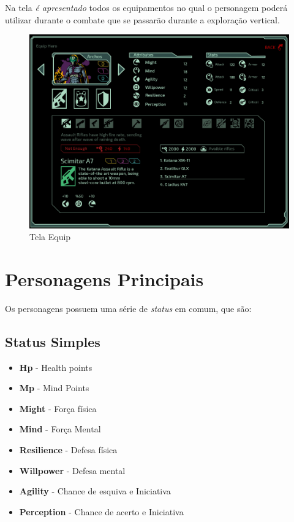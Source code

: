 \documentclass[11pt]{article} %
\begin{document}
Na tela \textit{é apresentado} todos os equipamentos no qual o personagem poderá utilizar durante o combate que se passarão durante a exploração vertical.

\begin{figure}[!htp]
\centering
\includegraphics[scale=0.25]{res/equip.png}
\caption{Tela Equip}
\label{Tela Equip}
\end{figure}

\section{Personagens Principais}

Os personagens possuem uma série de \textit{status} em comum, que são:

\subsection{Status Simples}

\begin {itemize}
  \item \textbf{Hp} - Health points 
  \item \textbf{Mp} - Mind Points 
  \item \textbf{Might} - Força física 
  \item \textbf{Mind} - Força Mental 
  \item \textbf{Resilience} - Defesa física 
  \item \textbf{Willpower} - Defesa mental 
  \item \textbf{Agility} - Chance de esquiva e Iniciativa 
  \item \textbf{Perception} - Chance de acerto e Iniciativa
\end {itemize}
\end{document}
